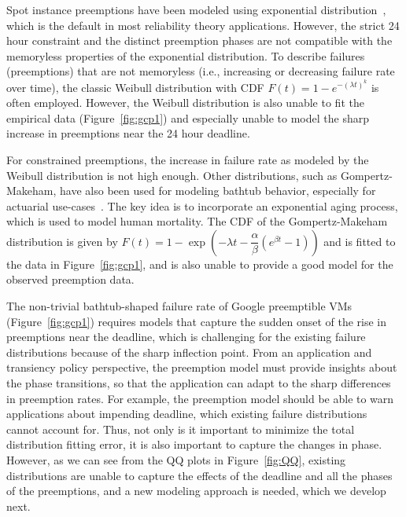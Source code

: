 Spot instance preemptions have been modeled using exponential distribution~\cite{bid-cloud, hotcloud-not-bid, flint}, which is the default in most reliability theory applications. 
However, the strict 24 hour constraint and the distinct preemption phases are not compatible with the memoryless properties of the exponential distribution. 
%
To describe failures (preemptions) that are not memoryless (i.e., increasing or decreasing failure rate over time), the classic Weibull distribution with CDF $F(t)=1-e^{-(\lambda t)^k}$ is often employed. However, the Weibull distribution is also unable to fit the empirical data (Figure~\ref{fig:gcp1}) and especially unable to model the sharp increase in preemptions near the 24 hour deadline. 

For constrained preemptions, the increase in failure rate as modeled by the Weibull distribution is not high enough.
Other distributions, such as Gompertz-Makeham, have also been used for modeling bathtub behavior, especially  for actuarial use-cases~\cite{missov2013gompertz}. 
The key idea is to incorporate an exponential aging process, which is used to model human mortality.
The CDF of the Gompertz-Makeham distribution is given by $F(t) = 1 - \exp\left(-\lambda t - \dfrac{\alpha}{\beta}(e^{\beta t} - 1) \right)$
and is fitted to the data in Figure~\ref{fig:gcp1}, and is also unable to provide a good model for the observed preemption data.
%






The non-trivial bathtub-shaped failure rate of Google preemptible VMs (Figure~\ref{fig:gcp1}) requires models that capture the sudden onset of the rise in preemptions near the deadline, which is challenging for the existing failure distributions because of the sharp inflection point. 
From an application and transiency policy perspective, the preemption model must provide insights about the phase transitions, so that the application can adapt to the sharp differences in preemption rates.
%
For example, the preemption model should be able to warn applications about impending deadline, which existing failure distributions cannot account for. 
Thus, not only is it important to minimize the total distribution fitting error, it is also important to capture the changes in phase.
However, as we can see from the QQ plots in Figure~\ref{fig:QQ}, existing distributions are unable to capture the effects of the deadline and all the phases of the preemptions, and a new modeling approach is needed, which we develop next.  

